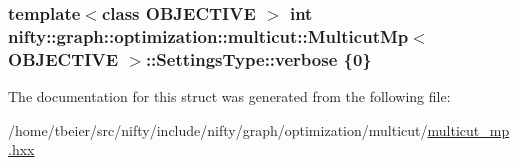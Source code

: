 \subsubsection[{verbose}]{\setlength{\rightskip}{0pt plus 5cm}template$<$class O\+B\+J\+E\+C\+T\+I\+V\+E $>$ int {\bf nifty\+::graph\+::optimization\+::multicut\+::\+Multicut\+Mp}$<$ O\+B\+J\+E\+C\+T\+I\+V\+E $>$\+::Settings\+Type\+::verbose \{0\}}\label{structnifty_1_1graph_1_1optimization_1_1multicut_1_1MulticutMp_1_1SettingsType_a9c5d06bfe96084985dd4cb55abe5969f}


The documentation for this struct was generated from the following file\+:\begin{DoxyCompactItemize}
\item 
/home/tbeier/src/nifty/include/nifty/graph/optimization/multicut/\hyperlink{multicut__mp_8hxx}{multicut\+\_\+mp.\+hxx}\end{DoxyCompactItemize}
